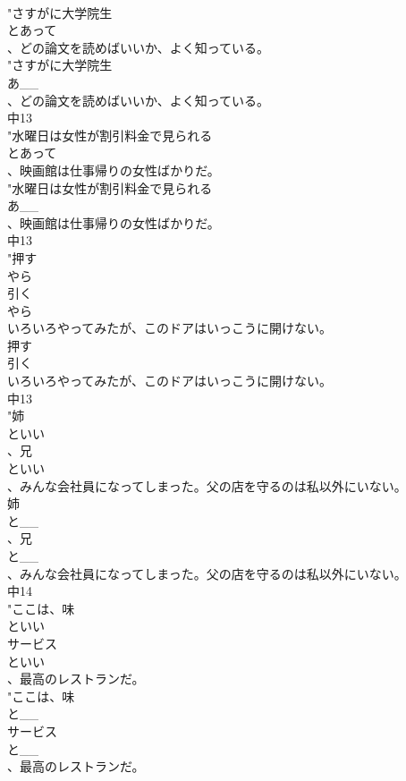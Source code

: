 \documentclass[8pt]{extreport}
\begin{document}
\begin{CJK}{UTF8}{min}
\\	"さすがに大学院生
\\	とあって
\\	、どの論文を読めばいいか、よく知っている。
\\	"さすがに大学院生
\\	あ__
\\	、どの論文を読めばいいか、よく知っている。
\\	中13
\\	"水曜日は女性が割引料金で見られる
\\	とあって
\\	、映画館は仕事帰りの女性ばかりだ。
\\	"水曜日は女性が割引料金で見られる
\\	あ__
\\	、映画館は仕事帰りの女性ばかりだ。
\\	中13
\\	"押す
\\	やら
\\	引く
\\	やら
\\	いろいろやってみたが、このドアはいっこうに開けない。
\\	押す
\\	引く
\\	いろいろやってみたが、このドアはいっこうに開けない。
\\	中13
\\	"姉
\\	といい
\\	、兄
\\	といい
\\	、みんな会社員になってしまった。父の店を守るのは私以外にいない。
\\	姉
\\	と__
\\	、兄
\\	と__
\\	、みんな会社員になってしまった。父の店を守るのは私以外にいない。
\\	中14
\\	"ここは、味
\\	といい
\\	サービス
\\	といい
\\	、最高のレストランだ。
\\	"ここは、味
\\	と__
\\	サービス
\\	と__
\\	、最高のレストランだ。

\end{CJK}
\end{document}
